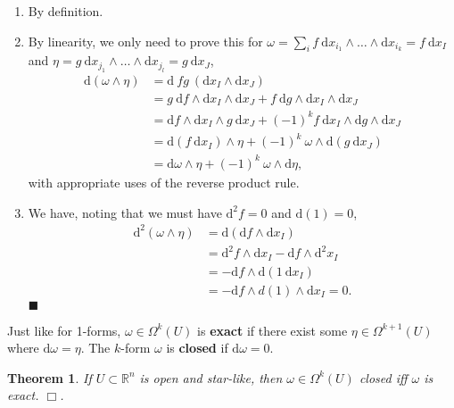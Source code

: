 \documentclass[letter-paper]{tufte-book}
\newtheorem{theorem}{\color{pastel-blue}Theorem}[section]
\newenvironment{proof}[1][Proof]{\begin{trivlist}
\item[\hskip \labelsep {\bfseries #1}]}{\end{trivlist}}
\newcommand{\qed}{\hfill$\blacksquare$}
\newcommand{\qedwhite}{\hfill \ensuremath{\Box}}
\begin{document}
\begin{proof}
  \begin{enumerate}
    \item By definition.
    
    \item By linearity, we only need to prove this for $\omega = \sum_i f\ \mathrm{d}x_{i_1} \wedge \ldots \wedge \mathrm{d}x_{i_k} = f\ \mathrm{d}x_I$ and $\eta = g\ \mathrm{d}x_{j_1} \wedge \ldots \wedge \mathrm{d}x_{j_l} = g\ \mathrm{d}x_J$,
    \begin{align*}
      \mathrm{d}(\omega \wedge \eta) 
        &= \mathrm{d}\ fg\ (\mathrm{d}x_I \wedge \mathrm{d}x_J) \\
        &= g\ \mathrm{d}f \wedge \mathrm{d}x_I \wedge \mathrm{d}x_J + f\ \mathrm{d}g \wedge \mathrm{d}x_I \wedge \mathrm{d}x_J\\
        &= \mathrm{d}f \wedge \mathrm{d}x_I \wedge g\ \mathrm{d}x_J + (-1)^k f\ \mathrm{d}x_I \wedge \mathrm{d}g \wedge \mathrm{d}x_J\\
        &= \mathrm{d}(f\ \mathrm{d}x_I) \wedge \eta + (-1)^k\ \omega \wedge \mathrm{d}(g\ \mathrm{d}x_J)\\
        &= \mathrm{d}\omega \wedge \eta + (-1)^k\ \omega \wedge \mathrm{d}\eta,
    \end{align*}
    with appropriate uses of the reverse product rule.
    
    \item We have, noting that we must have $\mathrm{d}^2 f = 0$ and $\mathrm{d}(1) = 0$,
    \begin{align*}
      \mathrm{d}^2 (\omega \wedge \eta) 
        &= \mathrm{d}(\mathrm{d}f \wedge \mathrm{d}x_I)\\
        &= \mathrm{d}^2 f \wedge \mathrm{d}x_I - \mathrm{d}f \wedge \mathrm{d}^2 x_I\\
        &= -\mathrm{d}f \wedge \mathrm{d}(1\ \mathrm{d}x_I)\\
        &= -\mathrm{d}f \wedge d(1) \wedge \mathrm{d}x_I = 0.
    \end{align*}
    \qed
  \end{enumerate}
\end{proof}

Just like for 1-forms, $\omega \in \Omega^k(U)$ is \textbf{exact} if there exist some $\eta \in \Omega^{k+1}(U)$ where $\mathrm{d}\omega = \eta$. The $k$-form $\omega$ is \textbf{closed} if $\mathrm{d}\omega = 0$.

\begin{theorem}
  If $U \subset \mathbb{R}^n$ is open and star-like, then $\omega \in \Omega^k(U)$ closed iff $\omega$ is exact. \qedwhite.
\end{theorem}
\end{document}
